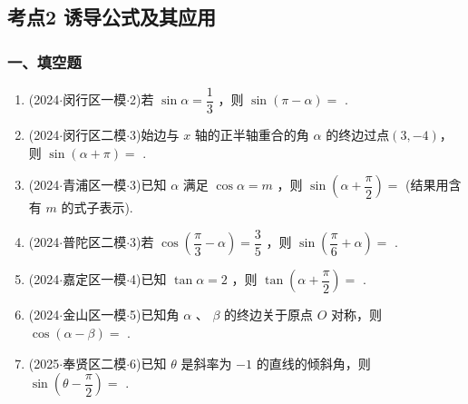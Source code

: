 \subsection*{考点2 诱导公式及其应用}

\subsubsection*{一、填空题}
\begin{enumerate}
    \item (2024$\cdot$闵行区一模$\cdot$2)若 $\sin \alpha  = \dfrac{1}{3}$ ，则 $\sin \left( {\pi  - \alpha }\right)  =$ .

    \item (2024$\cdot$闵行区二模$\cdot$3)始边与 $x$ 轴的正半轴重合的角 $\alpha$ 的终边过点$(3,-4)$，则 $\sin \left( {\alpha  + \pi }\right)  =$ .

    \item (2024$\cdot$青浦区一模$\cdot$3)已知 $\alpha$ 满足 $\cos \alpha  = m$ ，则 $\sin \left( {\alpha  + \dfrac{\pi }{2}}\right)  =$ (结果用含有 $m$ 的式子表示).

    \item (2024$\cdot$普陀区二模$\cdot$3)若 $\cos \left( {\dfrac{\pi }{3} - \alpha }\right)  = \dfrac{3}{5}$ ，则 $\sin \left( {\dfrac{\pi }{6} + \alpha }\right)  =$ .

    \item (2024$\cdot$嘉定区一模$\cdot$4)已知 $\tan \alpha  = 2$ ，则 $\tan \left( {\alpha  + \dfrac{\pi }{2}}\right)  =$ .

    \item (2024$\cdot$金山区一模$\cdot$5)已知角 $\alpha$ 、 $\beta$ 的终边关于原点 $O$ 对称，则 $\cos \left( {\alpha  - \beta }\right)  =$ .

    \item (2025$\cdot$奉贤区二模$\cdot$6)已知 $\theta$ 是斜率为 $-1$ 的直线的倾斜角，则 $\sin \left( {\theta  - \dfrac{\pi }{2}}\right)  =$ .
\end{enumerate}

